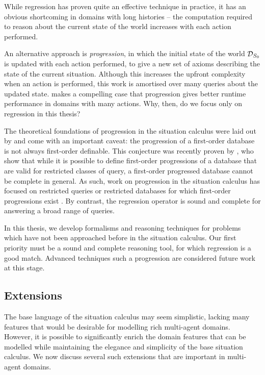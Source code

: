 While regression has proven quite an effective technique in practice,
it has an obvious shortcoming in domains with long histories -- the
computation required to reason about the current state of the world
increases with each action performed.

An alternative approach is \emph{progression}, in which the initial
state of the world $\mathcal{D}_{S_{0}}$ is updated with each action performed,
to give a new set of axioms describing the state of the current situation.
Although this increases the upfront complexity when an action is performed,
this work is amortised over many queries about the updated state.
\citet{thielscher04case_for_progression} makes a compelling case
that progression gives better runtime performance in domains with
many actions. Why, then, do we focus only on regression in this thesis?

The theoretical foundations of progression in the situation calculus
were laid out by \citet{reiter97progression} and come with an important
caveat: the progression of a first-order database is not always first-order
definable. This conjecture was recently proven by \citet{vassos08progression_future_queries},
who show that while it is possible to define first-order progressions
of a database that are valid for restricted classes of query, a first-order
progressed database cannot be complete in general. As such, work on
progression in the situation calculus has focused on restricted queries
or restricted databases for which first-order progressions exist  \citep{liu05sc_progression_knowledge,vassos07progression,vassos08fo_strong_progression}.
By contrast, the regression operator is sound and complete for answering
a broad range of queries.

In this thesis, we develop formalisms and reasoning techniques for
problems which have not been approached before in the situation calculus.
Our first priority must be a sound and complete reasoning tool, for
which regression is a good match. Advanced techniques such a progression
are considered future work at this stage.


\subsection{Extensions\label{sec:Background:Extensions}}

The base language of the situation calculus may seem simplistic, lacking
many features that would be desirable for modelling rich multi-agent
domains. However, it is possible to significantly enrich the domain
features that can be modelled while maintaining the elegance and simplicity
of the base situation calculus. We now discuss several such extensions
that are important in multi-agent domains.


